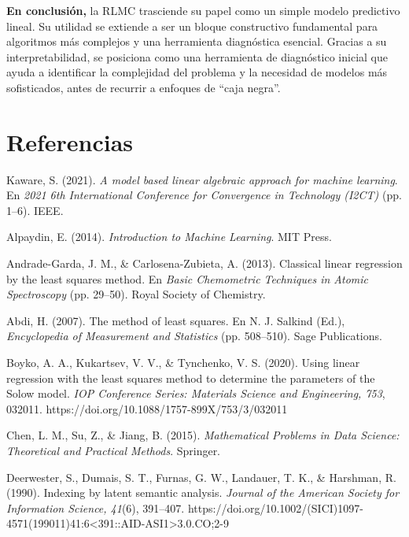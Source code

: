 \documentclass[12pt]{article}
\begin{document}
        \noindent
        \textbf{En conclusión,} la RLMC trasciende su papel como un simple modelo predictivo lineal. Su utilidad se extiende a ser un bloque constructivo fundamental para algoritmos más complejos y una herramienta diagnóstica esencial. Gracias a su interpretabilidad, se posiciona como una herramienta de diagnóstico inicial que ayuda a identificar la complejidad del problema y la necesidad de modelos más sofisticados, antes de recurrir a enfoques de “caja negra”.
        
        \section{Referencias}
        \noindent
        \hangindent=0.5in  Kaware, S. (2021). \textit{A model based linear algebraic approach for machine learning}. En \textit{2021 6th International Conference for Convergence in Technology (I2CT)} (pp. 1–6). IEEE.\par
        \hangindent=0.5in  Alpaydin, E. (2014). \textit{Introduction to Machine Learning}. MIT Press.\par
        \hangindent=0.5in  Andrade-Garda, J. M., \& Carlosena-Zubieta, A. (2013). Classical linear regression by the least squares method. En \textit{Basic Chemometric Techniques in Atomic Spectroscopy} (pp. 29–50). Royal Society of Chemistry.\par
        \hangindent=0.5in  Abdi, H. (2007). The method of least squares. En N. J. Salkind (Ed.), \textit{Encyclopedia of Measurement and Statistics} (pp. 508–510). Sage Publications.\par
        \hangindent=0.5in  Boyko, A. A., Kukartsev, V. V., \& Tynchenko, V. S. (2020). Using linear regression with the least squares method to determine the parameters of the Solow model. \textit{IOP Conference Series: Materials Science and Engineering, 753}, 032011. https://doi.org/10.1088/1757-899X/753/3/032011\par
        \hangindent=0.5in  Chen, L. M., Su, Z., \& Jiang, B. (2015). \textit{Mathematical Problems in Data Science: Theoretical and Practical Methods}. Springer.\par
        \hangindent=0.5in  Deerwester, S., Dumais, S. T., Furnas, G. W., Landauer, T. K., \& Harshman, R. (1990). Indexing by latent semantic analysis. \textit{Journal of the American Society for Information Science, 41}(6), 391–407. https://doi.org/10.1002/(SICI)1097-4571(199011)41:6<391::AID-ASI1>3.0.CO;2-9\par
\end{document}
